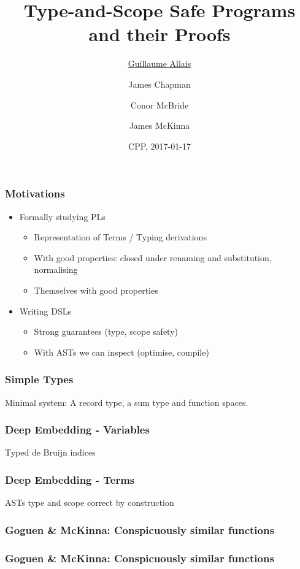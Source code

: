 \documentclass[xetex, mathserif, serif]{beamer}
\title{Type-and-Scope Safe Programs and their Proofs}
\author[me]{\underline{Guillaume Allais} \and James Chapman \and Conor McBride \and James McKinna}
\institute{}
\date{CPP, 2017-01-17}
\begin{document}
 
  \begin{frame}
    \titlepage
  \end{frame}

  \begin{frame}\frametitle{Motivations}
    \begin{itemize}
      \item Formally studying PLs
      \begin{itemize}
        \item Representation of Terms / Typing derivations
        \item With good properties: closed under renaming and substitution, normalising
        \item Themselves with good properties
      \end{itemize}
      \item Writing DSLs
      \begin{itemize}
        \item Strong guarantees (type, scope safety)
        \item With ASTs we can inspect (optimise, compile)
      \end{itemize}  
    \end{itemize}
  \end{frame}
  
  \begin{frame}\frametitle{Simple Types}
    Minimal system: A record type, a sum type and function spaces.

    \unskip
    \unskip
  \end{frame}

  \begin{frame}\frametitle{Deep Embedding - Variables}
    Typed de Bruijn indices

    \unskip
  \end{frame}
  \begin{frame}\frametitle{Deep Embedding - Terms}
    ASTs type and scope correct by construction

    \unskip
  \end{frame}

  \begin{frame}\frametitle{Goguen \& McKinna: Conspicuously similar functions}
  \end{frame}
  \begin{frame}\frametitle{Goguen \& McKinna: Conspicuously similar functions}
  \end{frame}
\end{document}
